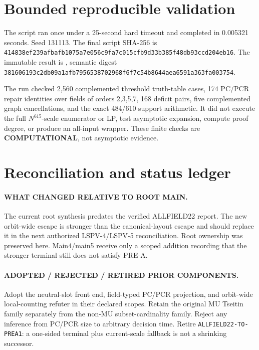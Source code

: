 \documentclass[11pt]{article}
\newcommand{\COMP}{\textbf{COMPUTATIONAL}}
\begin{document}
\section{Bounded reproducible validation}
The script
ran once under a 25-second hard timeout and completed in 0.005321 seconds.
Seed 131113.  The final script SHA-256 is
\texttt{414838ef239afbafb1075a7e056c9fa7c015cfb9d33b385f48db93ccd204eb16}.
The immutable
result is
,
semantic digest
\texttt{381606193c2db09a1afb7956538702968f6f7c54b8644aea6591a363fa003754}.

The run checked 2,560 complemented threshold truth-table cases, 174
PC/PCR repair identities over fields of orders 2,3,5,7, 168 deficit pairs,
five complemented graph cancellations, and the exact 484/610 support
arithmetic.  It did not execute the full $N^{615}$-scale enumerator or LP,
test asymptotic expansion, compute proof degree, or produce an all-input
wrapper.  These finite checks are \COMP{}, not asymptotic evidence.

\section{Reconciliation and status ledger}
\paragraph{WHAT CHANGED RELATIVE TO ROOT MAIN.}
The current root synthesis predates the verified ALLFIELD22 report.  The
new orbit-wide escape is stronger than the canonical-layout escape and
should replace it in the next authorized LSPV-4/LSPV-5 reconciliation.
Root ownership was preserved here.  Main4/main5 receive only a scoped
addition recording that the stronger terminal still does not satisfy PRE-A.

\paragraph{ADOPTED / REJECTED / RETIRED PRIOR COMPONENTS.}
Adopt the neutral-slot front end, field-typed PC/PCR projection, and
orbit-wide local-counting refuter in their declared scopes.  Retain the
original MU Tseitin family separately from the non-MU subset-cardinality
family.  Reject any inference from PC/PCR size to arbitrary decision time.
Retire \texttt{ALLFIELD22-TO-PREA1}: a one-sided terminal plus current-scale
fallback is not a shrinking successor.
\end{document}
